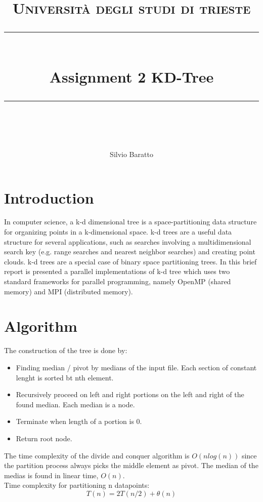 \documentclass[11pt,a4paper]{article}
\begin{document}
\newcommand{\horrule}[1]{\rule{\linewidth}{#1}}
\lstset{language=Java} 
\lstset{basicstyle=\footnotesize\ttfamily}
\author{Silvio Baratto}
\title{
\normalfont \normalsize 
\textsc{Università degli studi di trieste} \\ [25pt] %
\horrule{0.5pt} \\[0.4cm] %
\huge Assignment 2 KD-Tree\\ %
\horrule{2pt} \\[0.5cm] %
}
\maketitle
\tableofcontents
\newpage
\section{Introduction}
In computer science, a k-d dimensional tree is a space-partitioning data structure for organizing points in a k-dimensional space. k-d trees are a useful data structure for several applications, such as searches involving a multidimensional search key (e.g. range searches and nearest neighbor searches) and creating point clouds. k-d trees are a special case of binary space partitioning trees. In this brief report is presented a parallel implementations of k-d tree which uses two standard frameworks for parallel programming, namely OpenMP (shared memory) and MPI (distributed memory).
\section{Algorithm}
The construction of the tree is done by:
\begin{center}
\begin{itemize}
\item Finding median / pivot by medians of the input file. Each section of constant lenght is sorted bt nth element. \\
\item Recursively proceed on left and right portions on the left and right of the found median. Each median is a node. \\
\item Terminate when length of a portion is 0. \\
\item Return root node.
\end{itemize}
\end{center}
The time complexity of the divide and conquer algorithm is $O(nlog(n))$ since the partition process always picks the middle element as pivot. The median of the medias is found in linear time, $O(n)$.\\
Time complexity for partitioning n datapoints:
\begin{equation*}
T(n) = 2T(n / 2)+ \theta{(n)}
\end{equation*}
\end{document}
